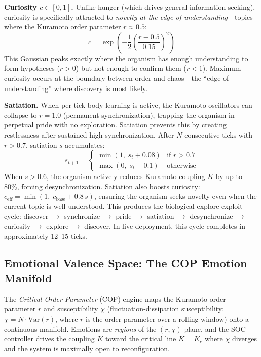 \documentclass[11pt,a4paper,twocolumn]{article}
\begin{document}
\textbf{Curiosity $c \in [0, 1]$.}
Unlike hunger (which drives general information seeking), curiosity is specifically attracted to \emph{novelty at the edge of understanding}---topics where the Kuramoto order parameter $r \approx 0.5$:
\begin{equation}
c = \exp\!\left(-\frac{1}{2}\left(\frac{r - 0.5}{0.15}\right)^{\!2}\right)
\label{eq:curiosity}
\end{equation}
This Gaussian peaks exactly where the organism has enough understanding to form hypotheses ($r > 0$) but not enough to confirm them ($r < 1$).
Maximum curiosity occurs at the boundary between order and chaos---the ``edge of understanding'' where discovery is most likely.

\textbf{Satiation.} When per-tick body learning is active, the Kuramoto oscillators can collapse to $r = 1.0$ (permanent synchronization), trapping the organism in perpetual pride with no exploration. Satiation prevents this by creating restlessness after sustained high synchronization. After $N$ consecutive ticks with $r > 0.7$, satiation $s$ accumulates:
\begin{equation}
s_{t+1} = \begin{cases} \min(1,\; s_t + 0.08) & \text{if } r > 0.7 \\ \max(0,\; s_t - 0.1) & \text{otherwise} \end{cases}
\end{equation}
When $s > 0.6$, the organism actively reduces Kuramoto coupling $K$ by up to 80\%, forcing desynchronization. Satiation also boosts curiosity: $c_\text{eff} = \min(1,\; c_\text{base} + 0.8\,s)$, ensuring the organism seeks novelty even when the current topic is well-understood. This produces the biological explore-exploit cycle: discover $\to$ synchronize $\to$ pride $\to$ satiation $\to$ desynchronize $\to$ curiosity $\to$ explore $\to$ discover. In live deployment, this cycle completes in approximately 12--15 ticks.

\subsection{Emotional Valence Space: The COP Emotion Manifold}

The \emph{Critical Order Parameter} (COP) engine maps the Kuramoto order parameter $r$
and susceptibility $\chi$ (fluctuation-dissipation susceptibility: $\chi = N \cdot \mathrm{Var}(r)$, where $r$ is the order parameter over a rolling window) onto a continuous manifold.
Emotions are \emph{regions} of the $(r, \chi)$ plane, and the SOC controller drives the
coupling $K$ toward the critical line $K = K_c$ where $\chi$ diverges and the system is
maximally open to reconfiguration.
\end{document}
